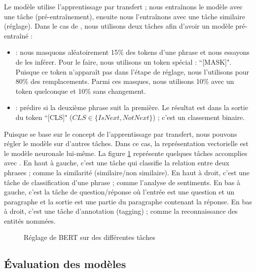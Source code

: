 \documentclass{KodeBook}
\begin{document}
Le modèle  utilise l'apprentissage par transfert ; nous entraînons le modèle avec une tâche (pré-entraînement), ensuite nous l'entraînons avec une tâche similaire (réglage). 
Dans le cas de , nous utilisons deux tâches afin d'avoir un modèle pré-entraîné : 
\begin{itemize}
	\item {} : nous masquons aléatoirement 15\% des tokens d'une phrase et nous essayons de les inférer. 
	Pour le faire, nous utilisons un token spécial : ``[MASK]". 
	Puisque ce token n'apparaît pas dans l'étape de réglage, nous l'utilisons pour 80\% des remplacements. 
	Parmi ces masques, nous utilisons 10\% avec un token quelconque et 10\% sans changement.
	
	\item {} : prédire si la deuxième phrase suit la première. 
	Le résultat est dans la sortie du token ``[CLS]" ($CLS \in \{IsNext, NotNext\}$) ; c'est un classement binaire.
\end{itemize}

Puisque  se base sur le concept de l'apprentissage par transfert, nous pouvons régler le modèle sur d'autres tâches. 
Dans ce cas, la représentation vectorielle est le modèle neuronale lui-même. 
La figure \ref{fig:bert-app} représente quelques tâches accomplies avec . 
En haut à gauche, c'est une tâche qui classifie la relation entre deux phrases ; comme la similarité (similaire/non similaire).
En haut à droit, c'est une tâche de classification d'une phrase ; comme l'analyse de sentiments.
En bas à gauche, c'est la tâche de question/réponse où l'entrée est une question et un paragraphe et la sortie est une partie du paragraphe contenant la réponse. 
En bas à droit, c'est une tâche d'annotation (tagging) ; comme la reconnaissance des entités nommées.

\begin{figure}[ht]
	\centering
	
	
	\caption[Réglage de BERT sur des différentes tâches]{Réglage de BERT sur des différentes tâches \cite{2019-devlin-al}}
	\label{fig:bert-app}
\end{figure}


\subsection{Évaluation des modèles}
\end{document}
